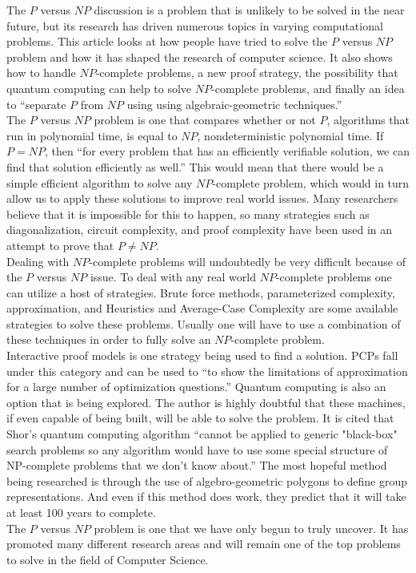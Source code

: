 \documentclass[11pt]{article}
\begin{document}
\begin{spacing}{1.5}
\indent The $P$ versus $NP$ discussion is a problem that is unlikely to be solved in the near future, but its research has driven numerous
  topics in varying computational problems. This article looks at how people have tried to solve the $P$ versus $NP$ problem and how it has
  shaped the research of computer science. It also shows how to handle $NP$-complete problems, a new proof strategy, the possibility that
  quantum computing can help to solve $NP$-complete problems, and finally an idea to ``separate $P$ from $NP$ using using algebraic-geometric
  techniques.'' \\
\indent The $P$ versus $NP$ problem is one that compares whether or not $P$, algorithms that run in polynomial time, is equal to $NP$,
  nondeterministic polynomial time. If $P=NP$, then ``for every problem that has an efficiently verifiable solution, we can find that solution
  efficiently as well.'' This would mean that there would be a simple efficient algorithm to solve any $NP$-complete problem, which would in
  turn allow us to apply these solutions to improve real world issues. Many researchers believe that it is impossible for this to happen, so
  many strategies such as diagonalization, circuit complexity, and proof complexity have been used in an attempt to prove that $P \neq NP$. \\
\indent Dealing with $NP$-complete problems will undoubtedly be very difficult because of the $P$ versus $NP$ issue. To deal with any real world
  $NP$-complete problems one can utilize a host of strategies. Brute force methods, parameterized complexity, approximation, and Heuristics and
  Average-Case Complexity are some available strategies to solve these problems. Usually one will have to use a combination of these techniques
  in order to fully solve an $NP$-complete problem. \\
\indent Interactive proof models is one strategy being used to find a solution. PCPs fall under this category and can be used to
  ``to show the limitations of approximation for a large number of optimization questions.'' Quantum computing is also an option that is being
  explored. The author is highly doubtful that these machines, if even capable of being built, will be able to solve the problem. It is cited
  that Shor's quantum computing algorithm ``cannot be applied to generic "black-box" search problems so any algorithm would have to use
  some special structure of NP-complete problems that we don't know about.'' The most hopeful method being researched is through the use of
  algebro-geometric polygons to define group representations. And even if this method does work, they predict that it will take at least
  100 years to complete.\\
\indent The $P$ versus $NP$ problem is one that we have only begun to truly uncover. It has promoted many different research areas and will
  remain one of the top problems to solve in the field of Computer Science.
\end{spacing}
\end{document}
